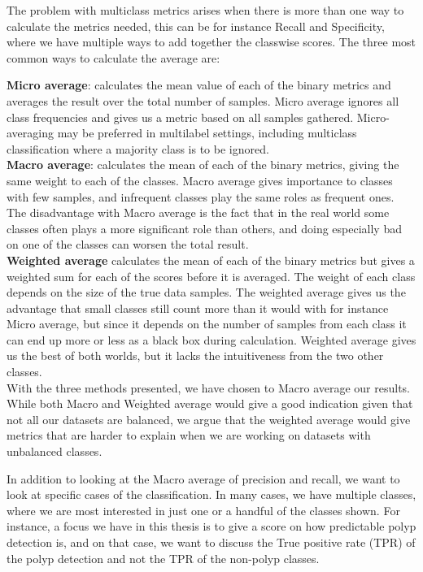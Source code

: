 The problem with multiclass metrics arises when there is more than one way to calculate the metrics needed, this can be for instance Recall and Specificity, where we have multiple ways to add together the classwise scores. The three most common ways to calculate the average are:

\textbf{Micro average}: calculates the mean value of each of the binary metrics and averages the result over the total number of samples. 
Micro average ignores all class frequencies and gives us a metric based on all samples gathered. Micro-averaging may be preferred in multilabel settings, including multiclass classification where a majority class is to be ignored.\\

\textbf{Macro average}: calculates the mean of each of the binary metrics, giving the same weight to each of the classes. Macro average gives importance to classes with few samples, and infrequent classes play the same roles as frequent ones. The disadvantage with Macro average is the fact that in the real world some classes often plays a more significant role than others, and doing especially bad on one of the classes can worsen the total result. \\

\textbf{Weighted average} calculates the mean of each of the binary metrics but gives a weighted sum for each of the scores before it is averaged. 
The weight of each class depends on the size of the true data samples.
The weighted average gives us the advantage that small classes still count more than it would with for instance Micro average, but since it depends on the number of samples from each class it can end up more or less as a black box during calculation.
Weighted average gives us the best of both worlds, but it lacks the intuitiveness from the two other classes. \\

With the three methods presented, we have chosen to Macro average our results. While both Macro and Weighted average would give a good indication given that not all our datasets are balanced, we argue that the weighted average would give metrics that are harder to explain when we are working on datasets with unbalanced classes.

In addition to looking at the Macro average of precision and recall, we want to look at specific cases of the classification.  In many cases, we have multiple classes, where we are most interested in just one or a handful of the classes shown. 
For instance, a focus we have in this thesis is to give a score on how predictable polyp detection is, and on that case, we want to discuss the True positive rate (TPR) of the polyp detection and not the TPR of the non-polyp classes. 

